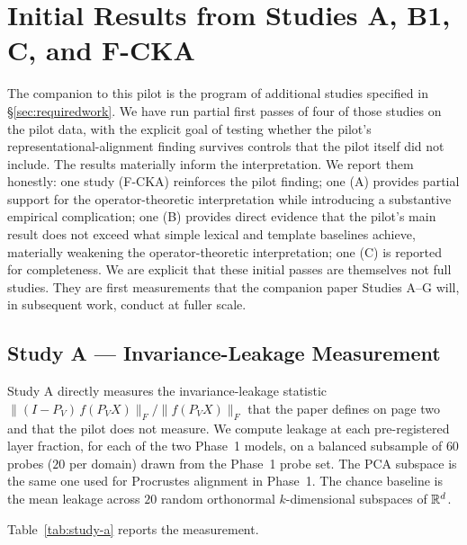 \section{Initial Results from Studies A, B1, C, and F-CKA}
\label{sec:initialstudies}

The companion to this pilot is the program of additional studies
specified in \S\ref{sec:requiredwork}. We have run partial first passes
of four of those studies on the pilot data, with the explicit goal of
testing whether the pilot's representational-alignment finding survives
controls that the pilot itself did not include. The results materially
inform the interpretation. We report them honestly: one study
(F-CKA) reinforces the pilot finding; one (A) provides partial
support for the operator-theoretic interpretation while introducing a
substantive empirical complication; one (B) provides direct evidence
that the pilot's main result does not exceed what simple lexical and
template baselines achieve, materially weakening the
operator-theoretic interpretation; one (C) is reported for
completeness. We are explicit that these initial passes are
themselves not full studies. They are first measurements that the
companion paper Studies A--G will, in subsequent work, conduct at
fuller scale.

\subsection{Study A — Invariance-Leakage Measurement}
\label{sec:results-study-a}

Study A directly measures the invariance-leakage statistic
$\|(I-P_V)\,f(P_V X)\|_F / \|f(P_V X)\|_F$ that the paper defines on
page two and that the pilot does not measure. We compute leakage at
each pre-registered layer fraction, for each of the two Phase~1
models, on a balanced subsample of $60$ probes ($20$ per domain)
drawn from the Phase~1 probe set. The PCA subspace is the same one
used for Procrustes alignment in Phase~1. The chance baseline is the
mean leakage across $20$ random orthonormal $k$-dimensional
subspaces of $\mathbb{R}^d$.

Table~\ref{tab:study-a} reports the measurement.

